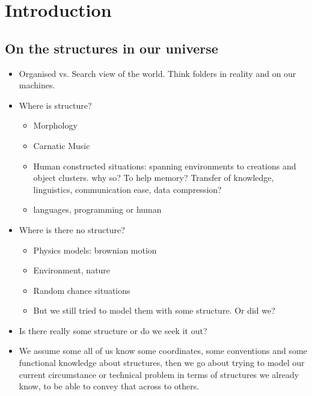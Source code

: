 



\chapter*{Introduction}
\label{chap:Intro}
\renewcommand{\chapterheadstart}{~\vspace{1.7cm}\\}
\section{On the structures in our universe}
\begin{itemize}
\item Organised vs. Search view of the world. Think folders in reality and on our machines.
\item Where is structure?
\begin{itemize}
\item Morphology
\item Carnatic Music
\item Human constructed situations: spanning environments to creations and object clusters. why 
so? To help memory? Transfer of knowledge, linguistics, communication ease, data compression?
\item languages, programming or human
\end{itemize}
\item Where is there no structure?
\begin{itemize}
\item Physics models: brownian motion
\item Environment, nature
\item Random chance situations
\item But we still tried to model them with some structure. Or did we?
\end{itemize}
\item Is there really some structure or do we seek it out?
\item We assume some all of us know some coordinates, some conventions and some functional knowledge about structures, then we go about trying to model our current circumstance or technical problem in terms of structures we already know, to be able to convey that across to others.
\end{itemize} 
